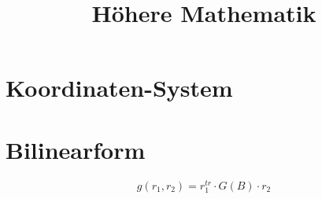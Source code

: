 \documentclass[11pt,a4paper]{scrarticle}
\title{Höhere Mathematik}
\begin{document}
\maketitle
\newpage
\tableofcontents
\newpage
\section{Koordinaten-System}

\section{Bilinearform}
$$
g(r_1, r_2) = r_1^{tr} \cdot G(B) \cdot r_2
$$
\end{document}
